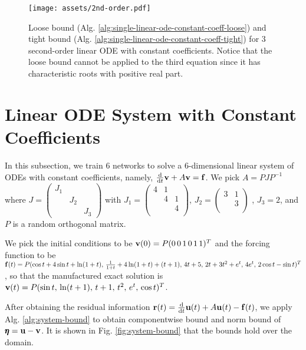    \begin{figure}[!ht]
        \centering
        \texttt{[image: assets/2nd-order.pdf]}
        \caption{
            Loose bound (Alg. \ref{alg:single-linear-ode-constant-coeff-loose}) and tight bound (Alg. \ref{alg:single-linear-ode-constant-coeff-tight}) for 3 second-order linear ODE with constant coefficients.
            Notice that the loose bound cannot be applied to the third equation since it has characteristic roots with positive real part.
        }\label{fig:2nd-order-bound} 
    \end{figure}

\section{Linear ODE System with Constant Coefficients} \label{section:high-dimension}
    In this subsection, we train $6$ networks to solve a $6$-dimensional linear system of ODEs with constant coefficients, namely, $\frac{\mathrm{d}}{\mathrm{d}t}\mathbf{v} + A\mathbf{v} = \mathbf{f}$. 
    We pick $A = PJP^{-1}$ where {$J=\begin{pmatrix}J_1\\[-1.25ex]&J_2\\[-1.25ex]&&J_3\end{pmatrix}$} with {$J_1 = \begin{pmatrix} 4&1\\[-1.25ex]&4&1\\[-1.25ex]&&4\\[-0.5ex]\end{pmatrix}$, $J_2 = \begin{pmatrix} 3&1\\[-1.25ex]&3\\[-0.25ex]\end{pmatrix}$ }, $J_3=2$, and $P$ is a random orthogonal matrix.

    We pick the initial conditions to be {$\mathbf{v}(0) = P(0\, 0\, 1\, 0\, 1\, 1)^{T}$} and the forcing function to be {$\mathbf{f}(t) = P(\cos t + 4 \sin t  + \ln(1+t),\, \frac{1}{1+t} + 4 \ln(1+t) + (t+1),\, 4t + 5,\, 2t + 3t^2 + e^t,\, 4 e^t,\, 2 \cos t - \sin t )^T$}, so that the manufactured exact solution is {$\mathbf{v}(t) = P ( \sin t,\, \ln(t + 1),\, t + 1,\, t^2,\, e^t,\, \cos t)^T$}.

    After obtaining the residual information {$\mathbf{r}(t)=\frac{\mathrm d}{\mathrm d t}\mathbf{u}(t) + A\mathbf{u}(t) - \mathbf{f}(t)$}, we apply Alg. \ref{alg:system-bound} to obtain componentwise bound and norm bound of {$\pmb{\eta} = \mathbf{u}-\mathbf{v}$}. 
    It is shown in Fig. \ref{fig:system-bound} that the bounds hold over the domain.

